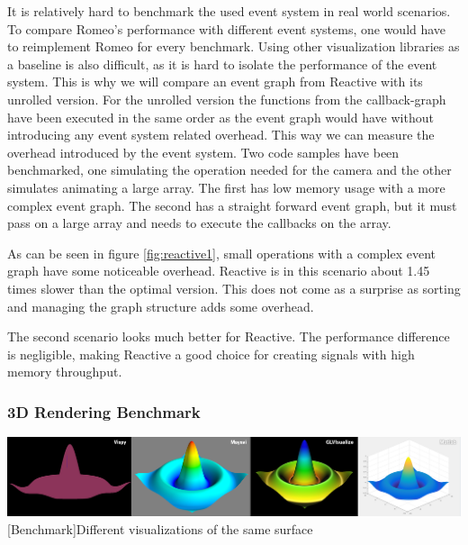 It is relatively hard to benchmark the used event system in real world scenarios. To compare Romeo's performance with different event systems, one would have to reimplement Romeo for every benchmark.
Using other visualization libraries as a baseline is also difficult, as it is hard to isolate the performance of the event system.
This is why we will compare an event graph from Reactive with its unrolled version.
For the unrolled version the functions from the callback-graph have been executed in the same order as the event graph would have without introducing any event system related overhead.
This way we can measure the overhead introduced by the event system.
Two code samples have been benchmarked, one simulating the operation needed for the camera and the other simulates animating a large array.
The first has low memory usage with a more complex event graph. The second has a straight forward event graph, but it must pass on a large array and needs to execute the callbacks on the array.

As can be seen in figure \ref{fig:reactive1}, small operations with a complex event graph have some noticeable overhead. Reactive is in this scenario about 1.45 times slower than the optimal version.
This does not come as a surprise as sorting and managing the graph structure adds some overhead.

The second scenario looks much better for Reactive. The performance difference is negligible, making Reactive a good choice for creating signals with high memory throughput.

\subsubsection{3D Rendering Benchmark}

\begin{minipage}{\linewidth}
    \centering
    \includegraphics[width=\linewidth]{graphics/vispy_mayavi_romeo.jpg}
    [Benchmark]{Different visualizations of the same surface}
    \label{fig:reactive1}
\end{minipage}


